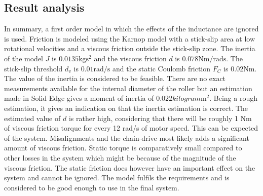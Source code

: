 \subsection{Result analysis}
In summary, a first order model in which the effects of the inductance are
ignored is used. Friction is modeled using the Karnop model with a stick-slip
area at low rotational velocities and a viscous friction outside the stick-slip
zone. The inertia of the model $J$ is $0.0135 \si{\kilogram\second^{2}}$ and the
viscous friction $d$ is $0.078 \si{\newton\meter\per\radian\second}$. The
stick-slip threshold $d_v$ is $0.01 \si{\radian\per\second}$ and the static
Coulomb friction $F_C$ is $0.02 \si{\newton\meter}$. The value of the inertia is
considered to be feasible. There are no exact measurements available for the
internal diameter of the roller but an estimation made in Solid Edge gives a
moment of inertia of $0.022 \si{kilogram\meter^{2}}$. Being a rough estimation,
it gives an indication on that the inertia estimation is correct. The estimated
value of $d$ is rather high, considering that there will be roughly 1 Nm of
viscous friction torque for every 12 rad/s of motor speed. This can be expected
of the system. Misalignments and the chain-drive most likely adds a significant
amount of viscous friction. Static torque is comparatively small compared to
other losses in the system which might be because of the magnitude of the
viscous friction. The static friction does however have an important effect on
the system and cannot be ignored. The model fulfils the requirements and is
considered to be good enough to use in the final system.
